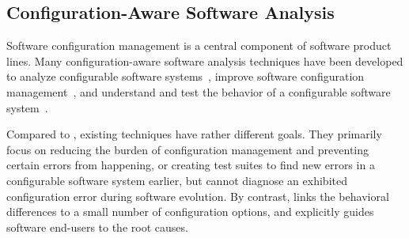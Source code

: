 \subsection{Configuration-Aware Software Analysis}

Software configuration management is a central component
of software product lines.
Many configuration-aware software analysis techniques
have been developed to analyze configurable software
systems~\cite{Bodden:2013:SLS, Kang:2005:FRL, Mende:2008:SGM,
Kruger:2005:SAE}, improve software configuration
management~\cite{Garvin:2011, Rabiser:2012:QSU, Cooray:2010:RRD,
Barreiros:2009:MRC, TerBeek:2011:GCE}, and understand and test
the behavior of a configurable software
system~\cite{Siegmund:2012:PPV, Qu:2008:CRT, SPLAT, Apel:2009:FLA, Shang:2013:ADB,
Staats:2011:PTO}.

Compared to \ourtool, existing techniques have rather different
goals. They primarily focus on reducing the burden of
configuration management and preventing certain errors from
happening, or creating test suites to find new errors in
a configurable software system earlier, but cannot
diagnose an exhibited configuration error during software evolution.
By contrast, \ourtool 
links the behavioral differences to a small number
of configuration options, and explicitly guides software end-users
to the root causes.







